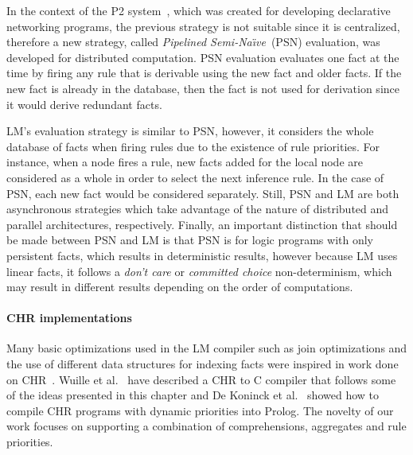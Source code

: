 In the context of the P2 system~\cite{Loo-condie-garofalakis-p2}, which was
created for developing declarative networking programs, the previous strategy is
not suitable since it is centralized, therefore a new strategy, called
\emph{Pipelined Semi-Na\"{\i}ve}~(PSN) evaluation, was developed for distributed
computation. PSN evaluation evaluates one fact at the time by firing any rule
that is derivable using the new fact and older facts. If the new fact is already
in the database, then the fact is not used for derivation since it would derive
redundant facts.

LM's evaluation strategy is similar to PSN, however, it considers the whole
database of facts when firing rules due to the existence of rule priorities.
For instance, when a node fires a rule, new facts added for the local node are
considered as a whole in order to select the next inference rule. In the case of
PSN, each new fact would be considered separately. Still, PSN and LM are both
asynchronous strategies which take advantage of the nature of distributed and
parallel architectures, respectively. Finally, an important distinction that
should be made between PSN and LM is that PSN is for logic programs with only
persistent facts, which results in deterministic results, however because LM
uses linear facts, it follows a \emph{don't care} or \emph{committed choice}
non-determinism, which may result in different results depending on the order of
computations.

\paragraph{CHR implementations} Many basic optimizations used in the LM compiler
such as join optimizations and the use of different data structures for indexing
facts were inspired in work done on CHR~\cite{DBLP:journals/corr/cs-PL-0408025}.
Wuille et al.~\cite{42866} have described a CHR to C compiler that follows some
of the ideas presented in this chapter and De Koninck et al.~\cite{chrp} showed
how to compile CHR programs with dynamic priorities into Prolog. The novelty of
our work focuses on supporting a combination of comprehensions, aggregates and
rule priorities.


